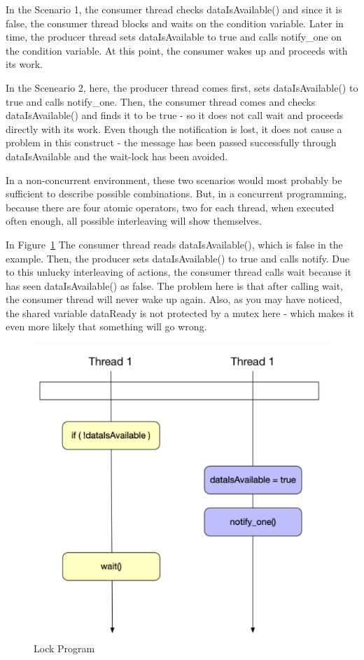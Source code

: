 \documentclass[11pt, a4paper]{article}
\begin{document}
In the Scenario 1, the consumer thread checks dataIsAvailable() and since it is false, the consumer thread blocks and waits on the condition variable. Later in time, the producer thread sets dataIsAvailable to true and calls notify\_one on the condition variable. At this point, the consumer wakes up and proceeds with its work.

In the Sceneario 2, here, the producer thread comes first, sets dataIsAvailable() to true and calls notify\_one. Then, the consumer thread comes and checks dataIsAvailable() and finds it to be true - so it does not call wait and proceeds directly with its work. Even though the notification is lost, it does not cause a problem in this construct - the message has been passed successfully through dataIsAvailable and the wait-lock has been avoided.


In a non-concurrent environment, these two scenarios would most probably be sufficient to describe possible combinations. But, in a concurrent programming, because there are four atomic operators, two for each thread, when executed often enough, all possible interleaving will show themselves. 



In Figure~\ref{fig:lock_program} The consumer thread reads dataIsAvailable(), which is false in the example. Then, the producer sets dataIsAvailable() to true and calls notify. Due to this unlucky interleaving of actions, the consumer thread calls wait because it has seen dataIsAvailable() as false. The problem here is that after calling wait, the consumer thread will never wake up again. Also, as you may have noticed, the shared variable dataReady is not protected by a mutex here - which makes it even more likely that something will go wrong.


\begin{figure}[htpb!]
	\centering
	\includegraphics[width=0.8\linewidth]{lock_program}
	\caption{Lock Program}
	\label{fig:lock_program}
\end{figure}
\end{document}
